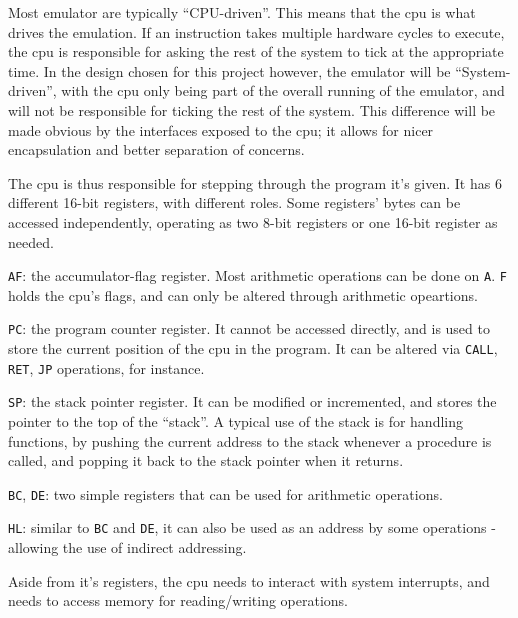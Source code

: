 \documentclass[11pt]{report}
\begin{document}
Most emulator are typically ``CPU-driven''. This means that the \gls{cpu} is what drives the emulation. If an instruction takes multiple hardware cycles to execute, the \gls{cpu} is responsible for asking the rest of the system to tick at the appropriate time. In the design chosen for this project however, the emulator will be ``System-driven'', with the \gls{cpu} only being part of the overall running of the emulator, and will not be responsible for ticking the rest of the system. This difference will be made obvious by the interfaces exposed to the \gls{cpu}; it allows for nicer encapsulation and better separation of concerns.

The \gls{cpu} is thus responsible for stepping through the program it's given. It has 6 different 16-bit registers, with different roles. Some registers' bytes can be accessed independently, operating as two 8-bit registers or one 16-bit register as needed.

\begin{compactitem}
	\item \texttt{AF}: the accumulator-flag register. Most arithmetic operations can be done on \texttt{A}. \texttt{F} holds the \gls{cpu}'s flags, and can only be altered through arithmetic opeartions.
	\item \texttt{PC}: the program counter register. It cannot be accessed directly, and is used to store the current position of the \gls{cpu} in the program. It can be altered via \texttt{CALL}, \texttt{RET}, \texttt{JP} operations, for instance.
	\item \texttt{SP}: the stack pointer register. It can be modified or incremented, and stores the pointer to the top of the ``stack''. A typical use of the stack is for handling functions, by pushing the current address to the stack whenever a procedure is called, and popping it back to the stack pointer when it returns.
	\item \texttt{BC}, \texttt{DE}: two simple registers that can be used for arithmetic operations.
	\item \texttt{HL}: similar to \texttt{BC} and \texttt{DE}, it can also be used as an address by some operations - allowing the use of indirect addressing.
\end{compactitem}

Aside from it's registers, the \gls{cpu} needs to interact with system interrupts, and needs to access memory for reading/writing operations.

%
\end{document}
